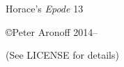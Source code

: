 \begin{titlepage}

\begin{center}

\huge Horace's \textit{Epode} 13

\vskip2in

\large \copyright Peter Aronoff 2014--\the\year

(See LICENSE for details)

\newpage

\end{center}

\end{titlepage}

